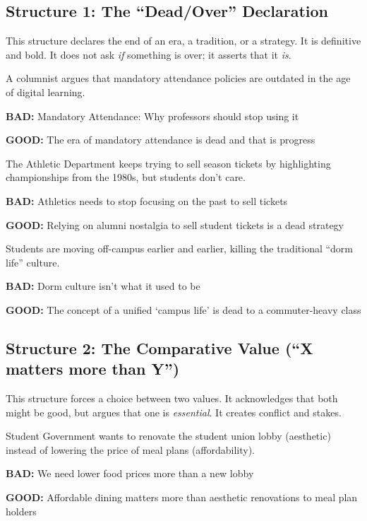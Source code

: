 \documentclass[12pt]{article}
\newcommand{\bad}[1]{\textbf{\textcolor{rose}{BAD:}} #1}
\newcommand{\good}[1]{\textbf{\textcolor{congaree}{GOOD:}} #1}
\newcommand{\context}[1]{#1}
\begin{document}
\subsection{Structure 1: The ``Dead/Over'' Declaration}
This structure declares the end of an era, a tradition, or a strategy. It is definitive and bold. It does not ask \textit{if} something is over; it asserts that it \textit{is}.

\begin{exampleblock}
\context{A columnist argues that mandatory attendance policies are outdated in the age of digital learning.}

\bad{Mandatory Attendance: Why professors should stop using it}

\good{The era of mandatory attendance is dead and that is progress}
\end{exampleblock}

\begin{exampleblock}
\context{The Athletic Department keeps trying to sell season tickets by highlighting championships from the 1980s, but students don't care.}

\bad{Athletics needs to stop focusing on the past to sell tickets}

\good{Relying on alumni nostalgia to sell student tickets is a dead strategy}
\end{exampleblock}

\begin{exampleblock}
\context{Students are moving off-campus earlier and earlier, killing the traditional ``dorm life'' culture.}

\bad{Dorm culture isn't what it used to be}

\good{The concept of a unified `campus life' is dead to a commuter-heavy class}
\end{exampleblock}

\newpage
\subsection{Structure 2: The Comparative Value (``X matters more than Y'')}
This structure forces a choice between two values. It acknowledges that both might be good, but argues that one is \textit{essential}. It creates conflict and stakes.

\begin{exampleblock}
\context{Student Government wants to renovate the student union lobby (aesthetic) instead of lowering the price of meal plans (affordability).}

\bad{We need lower food prices more than a new lobby}

\good{Affordable dining matters more than aesthetic renovations to meal plan holders}
\end{exampleblock}
\end{document}

